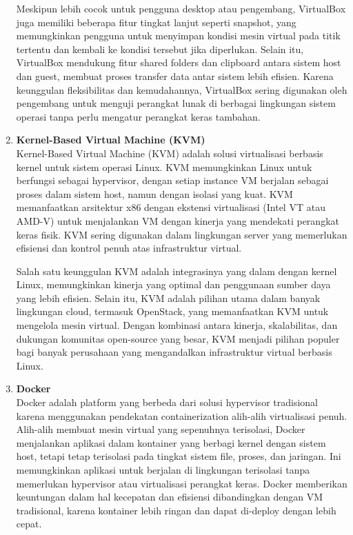 \documentclass[12pt]{article}
\begin{document}
\begin{enumerate}
    Meskipun lebih cocok untuk pengguna desktop atau pengembang, VirtualBox juga memiliki beberapa fitur tingkat lanjut seperti snapshot, yang memungkinkan pengguna untuk menyimpan kondisi mesin virtual pada titik tertentu dan kembali ke kondisi tersebut jika diperlukan. Selain itu, VirtualBox mendukung fitur shared folders dan clipboard antara sistem host dan guest, membuat proses transfer data antar sistem lebih efisien. Karena keunggulan fleksibilitas dan kemudahannya, VirtualBox sering digunakan oleh pengembang untuk menguji perangkat lunak di berbagai lingkungan sistem operasi tanpa perlu mengatur perangkat keras tambahan.

    \item \textbf{Kernel-Based Virtual Machine (KVM)} \\
    Kernel-Based Virtual Machine (KVM) adalah solusi virtualisasi berbasis kernel untuk sistem operasi Linux. KVM memungkinkan Linux untuk berfungsi sebagai hypervisor, dengan setiap instance VM berjalan sebagai proses dalam sistem host, namun dengan isolasi yang kuat. KVM memanfaatkan arsitektur x86 dengan ekstensi virtualisasi (Intel VT atau AMD-V) untuk menjalankan VM dengan kinerja yang mendekati perangkat keras fisik. KVM sering digunakan dalam lingkungan server yang memerlukan efisiensi dan kontrol penuh atas infrastruktur virtual.

    Salah satu keunggulan KVM adalah integrasinya yang dalam dengan kernel Linux, memungkinkan kinerja yang optimal dan penggunaan sumber daya yang lebih efisien. Selain itu, KVM adalah pilihan utama dalam banyak lingkungan cloud, termasuk OpenStack, yang memanfaatkan KVM untuk mengelola mesin virtual. Dengan kombinasi antara kinerja, skalabilitas, dan dukungan komunitas open-source yang besar, KVM menjadi pilihan populer bagi banyak perusahaan yang mengandalkan infrastruktur virtual berbasis Linux.

    \item \textbf{Docker} \\
    Docker adalah platform yang berbeda dari solusi hypervisor tradisional karena menggunakan pendekatan containerization alih-alih virtualisasi penuh. Alih-alih membuat mesin virtual yang sepenuhnya terisolasi, Docker menjalankan aplikasi dalam kontainer yang berbagi kernel dengan sistem host, tetapi tetap terisolasi pada tingkat sistem file, proses, dan jaringan. Ini memungkinkan aplikasi untuk berjalan di lingkungan terisolasi tanpa memerlukan hypervisor atau virtualisasi perangkat keras. Docker memberikan keuntungan dalam hal kecepatan dan efisiensi dibandingkan dengan VM tradisional, karena kontainer lebih ringan dan dapat di-deploy dengan lebih cepat.


\end{enumerate}
\end{document}
